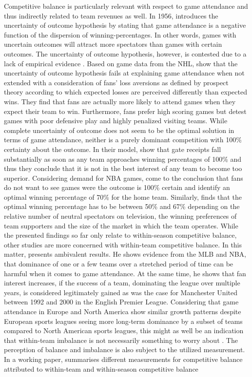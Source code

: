 \documentclass[12pt, a4paper]{article}
\begin{document}
Competitive balance is particularly relevant with respect to game attendance and thus indirectly related to team revenues as well. In 1956, \citeauthor{rottenberg_baseball_1956} introduces the uncertainty of outcome hypothesis by stating that game attendance is a negative function of the dispersion of winning-percentages. In other words, games with uncertain outcomes will attract more spectators than games with certain outcomes. The uncertainty of outcome hypothesis, however, is contested due to a lack of empirical evidence \citep[cf.][]{borland_demand_2003,szymanski_economic_2003}. Based on game data from the NHL, \citet{coates_game_2012} show that the uncertainty of outcome hypothesis fails at explaining game attendance when not extended with a consideration of fans' loss aversions as defined by prospect theory according to which expected losses are perceived differently than expected wins. They find that fans are actually more likely to attend games when they expect their team to win. Furthermore, fans prefer high scoring games but detest games with poor defensive play and highly penalized visiting teams. While complete uncertainty of outcome does not seem to be the optimal solution in terms of game attendance, neither is a purely dominant competition with 100\% certainty about the outcome. In their model,  \citet{el-hodiri_economic_1971} show that gate receipts fall substantially as soon as any team approaches winning percentages of 100\% and thus they conclude that it is not in the best interest of any team to become too superior. Considering demand for NBA games, \citet{rascher_fans_2007} come to the conclusion that fans do not want to see games were the outcome is 100\% certain and identify an optimal winning percentage of 70\% for the home team. Similarly, \citet{kesenne_optimal_2015} finds that the optimal winning percentage has to be between 50\% and 67\% depending on the relative number of neutral spectators on television, the winning preferences of team supporters and the size of the market in which the team operates. While the presented findings so far only relate to within-season competitive balance, other studies are more concerned with within-team competitive balance. In this matter, \citet{zimbalist_competitive_2002} presents ambivalent results. He shows evidence from the MLB and NBA, that dominance of one or a few teams over a stretched period of time can be harmful when it comes to game attendance. At the same time, he shows that fan interest increases, if the success of a team, dominating the league over multiple years, is considered legitimately gained as was the case for Manchester United between 1992 and 2000 in the English Premier League. Considering that game attendance in Europe and North America show similar growth patterns despite European sports leagues seeing more long-term dominance by a subset of teams compared to North American sports leagues, this might as well be an indication that within-team imbalance is not necessarily something to worry about \citep{szymanski_economic_2003}. The perception of balance and imbalance is also subject to the utilized measurement. In a working paper, \citet{goossens_competitive_2005} summarises different measurements for competitive balance attributed to within-team and within-season competitive balance 
\end{document}
